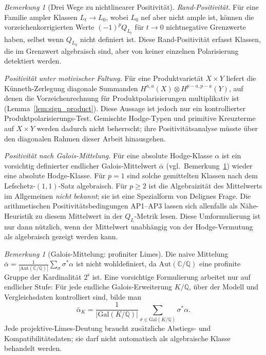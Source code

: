 \documentclass[aps,prd,twocolumn,superscriptaddress,nofootinbib]{revtex4-2}
\theoremstyle{definition}
\theoremstyle{remark}
\newtheorem{remark}[theorem]{Bemerkung}
\begin{document}
\begin{remark}[Drei Wege zu nichtlinearer Positivität]
\label{rem:nonlinear-positivity}
\emph{Rand-Positivität.}
Für eine Familie ampler Klassen $L_t \to L_0$, wobei $L_0$ nef aber nicht ample ist, können die vorzeichenkorrigierten Werte $(-1)^p Q_{L_t}$ für $t \to 0$ nichtnegative Grenzwerte haben, selbst wenn $Q_{L_0}$ nicht definiert ist. Diese \glqq Rand-Positivität\grqq{} erfasst Klassen, die im Grenzwert algebraisch sind, aber von keiner einzelnen Polarisierung detektiert werden.

\emph{Positivität unter motivischer Faltung.}
Für eine Produktvarietät $X \times Y$ liefert die Künneth-Zerlegung diagonale Summanden $H^{a,a}(X)\otimes H^{p-a,p-a}(Y)$, auf denen die Vorzeichenrechnung für Produktpolarisierungen multiplikativ ist (Lemma~\ref{lem:sign_product}). Diese Aussage ist jedoch nur ein kontrollierter Produktpolarisierungs-Test. Gemischte Hodge-Typen und primitive Kreuzterme auf $X\times Y$ werden dadurch nicht beherrscht; ihre Positivitätsanalyse müsste über den diagonalen Rahmen dieser Arbeit hinausgehen.

\emph{Positivität nach Galois-Mittelung.}
Für eine absolute Hodge-Klasse $\alpha$ ist ein vorsichtig definierter endlicher Galois-Mittelwert $\bar\alpha$ (vgl.\ Bemerkung~\ref{rem:galois-profinite}) wieder eine absolute Hodge-Klasse. Für $p=1$ sind solche gemittelten Klassen nach dem Lefschetz-$(1,1)$-Satz algebraisch. Für $p\geq2$ ist die Algebraizität des Mittelwerts im Allgemeinen \emph{nicht bekannt}; sie ist eine Spezialform von Delignes Frage. Die arithmetischen Positivitätsbedingungen AP1--AP3 lassen sich allenfalls als Nähe-Heuristik zu diesem Mittelwert in der $Q_L$-Metrik lesen. Diese Umformulierung ist nur dann nützlich, wenn der Mittelwert unabhängig von der Hodge-Vermutung als algebraisch gezeigt werden kann.
\end{remark}

\begin{remark}[Galois-Mittelung: profiniter Limes]\label{rem:galois-profinite}
Die naive Mittelung $\bar{\alpha} = \frac{1}{|\mathrm{Aut}(\mathbb{C}/\mathbb{Q})|} \sum_\sigma \sigma^*\alpha$ ist nicht wohldefiniert, da $\mathrm{Aut}(\mathbb{C}/\mathbb{Q})$ eine profinite Gruppe der Kardinalität $2^{\mathfrak{c}}$ ist. Eine vorsichtige Formulierung arbeitet nur auf endlicher Stufe: Für jede endliche Galois-Erweiterung $K/\mathbb{Q}$, über der Modell und Vergleichsdaten kontrolliert sind, bilde man
\[
\bar{\alpha}_K = \frac{1}{|\mathrm{Gal}(K/\mathbb{Q})|}
  \sum_{\sigma \in \mathrm{Gal}(K/\mathbb{Q})} \sigma^*\alpha.
\]
Jede projektive-Limes-Deutung braucht zusätzliche Abstiegs- und Kompatibilitätsdaten; sie darf nicht automatisch als algebraische Klasse behandelt werden.
\end{remark}
\end{document}
